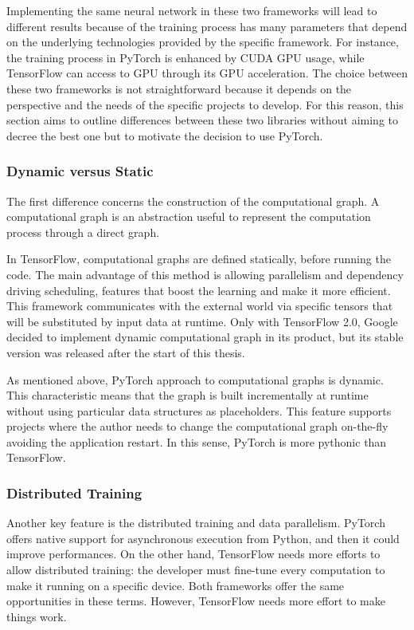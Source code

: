 Implementing the same neural network in these two frameworks will lead to different results because of the training process has many parameters that depend on the underlying technologies provided by the specific framework. For instance, the training process in PyTorch is enhanced by CUDA GPU usage, while TensorFlow can access to GPU through its GPU acceleration.
The choice between these two frameworks is not straightforward because it depends on the perspective and the needs of the specific projects to develop.
For this reason, this section aims to outline differences between these two libraries without aiming to decree the best one but to motivate the decision to use PyTorch.

\subsubsection{Dynamic versus Static}

The first difference concerns the construction of the computational graph. A computational graph is an abstraction useful to represent the computation process through a direct graph.

In TensorFlow, computational graphs are defined statically, before running the code. The main advantage of this method is allowing parallelism and dependency driving scheduling, features that boost the learning and make it more efficient. This framework communicates with the external world via specific tensors that will be substituted by input data at runtime.
Only with TensorFlow 2.0, Google decided to implement dynamic computational graph in its product, but its stable version was released after the start of this thesis.

As mentioned above, PyTorch approach to computational graphs is dynamic. This characteristic means that the graph is built incrementally at runtime without using particular data structures as placeholders. This feature supports projects where the author needs to change the computational graph on-the-fly avoiding the application restart. In this sense, PyTorch is more pythonic than TensorFlow.

\subsubsection{Distributed Training}

Another key feature is the distributed training and data parallelism. PyTorch offers native support for asynchronous execution from Python, and then it could improve performances. On the other hand, TensorFlow needs more efforts to allow distributed training: the developer must fine-tune every computation to make it running on a specific device. Both frameworks offer the same opportunities in these terms. However, TensorFlow needs more effort to make things work.

